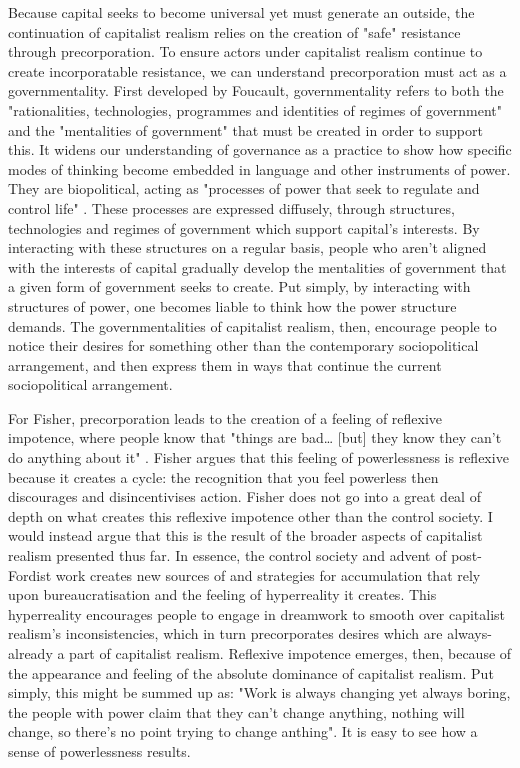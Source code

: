 Because capital seeks to become universal yet must generate an outside, the continuation of capitalist realism relies on the creation of "safe" resistance through precorporation. To ensure actors under capitalist realism continue to create incorporatable resistance, we can understand precorporation must act as a governmentality. First developed by Foucault, governmentality refers to both the "rationalities, technologies, programmes and identities of regimes of government" and the "mentalities of government" \citep[p. 24]{dean_governmentality_2010} that must be created in order to support this. It widens our understanding of governance as a practice to show how specific modes of thinking become embedded in language and other instruments of power.  They are biopolitical, acting as "processes of power that seek to regulate and control life" \citep[p. 50]{lemke_biopolitics_2011}. These processes are expressed diffusely, through structures, technologies and regimes of government which support capital's interests. By interacting with these structures on a regular basis, people who aren't aligned with the interests of capital gradually develop the mentalities of government that a given form of government seeks to create. Put simply, by interacting with structures of power, one becomes liable to think how the power structure demands. The governmentalities of capitalist realism, then, encourage people to notice their desires for something other than the contemporary sociopolitical arrangement, and then express them in ways that continue the current sociopolitical arrangement. 


For Fisher, precorporation leads to the creation of a feeling of reflexive impotence, where people know that "things are bad\ldots{} [but] they know they can't do anything about it" \citep[p. 24]{fisher_capitalist_2009}. Fisher argues that this feeling of powerlessness is reflexive because it creates a cycle: the recognition that you feel powerless then discourages and disincentivises action. Fisher does not go into a great deal of depth on what creates this reflexive impotence other than the control society. I would instead argue that this is the result of the broader aspects of capitalist realism presented thus far. In essence, the control society and advent of post-Fordist work creates new sources of and strategies for accumulation that rely upon bureaucratisation and the feeling of hyperreality it creates. This hyperreality encourages people to engage in dreamwork to smooth over capitalist realism's inconsistencies, which in turn precorporates desires which are always-already a part of capitalist realism. Reflexive impotence emerges, then, because of the appearance and feeling of the absolute dominance of capitalist realism. Put simply, this might be summed up as: "Work is always changing yet always boring, the people with power claim that they can't change anything, nothing will change, so there's no point trying to change anthing". It is easy to see how a sense of powerlessness results.

